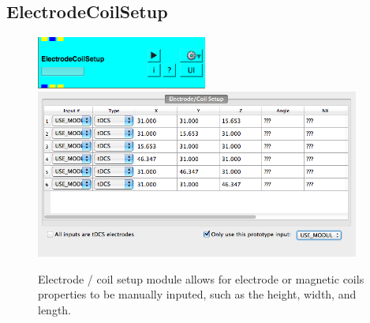 \documentclass[fleqn,11pt,openany]{book}
\newcommand{\imgSm}{0.5}
\begin{document}
\subsection{ElectrodeCoilSetup}
\begin{figure}[!h]
	\centering
	\includegraphics[width=\imgSm\textwidth]{BrainStimulation_figures/ElectrodeCoilSetup.png}
	\includegraphics[width=0.95\textwidth]{BrainStimulation_figures/ElectrodeCoilSetup_GUI.png}
	\caption{Electrode / coil setup module allows for electrode or magnetic coils properties to be manually inputed, such as the height, width, and length.}
	\label{fig:elec_coil_setup}
\end{figure}

 
\end{document}
